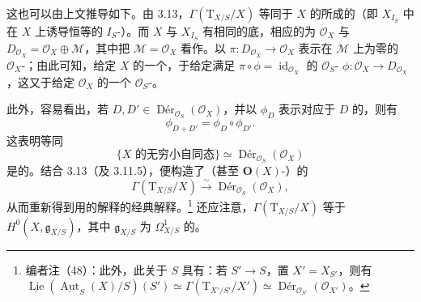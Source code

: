 这也可以由上文推导如下。由 3.13，$\Gamma(\mathrm T_{X/S}/X)$ 等同于 $X$ 的所成的（即 $X_{I_S}$ 中在 $X$ 上诱导恒等的 $I_S$-）。而 $X$ 与 $X_{I_S}$ 有相同的底，相应的为 $\mathcal O_X$ 与 $D_{\mathcal O_X}=\mathcal O_X\oplus\mathcal M$，其中把 $\mathcal M=\mathcal O_X$ 看作。以 $\pi:D_{\mathcal O_X}\to\mathcal O_X$ 表示在 $\mathcal M$ 上为零的 $\mathcal O_X$-；由此可知，给定 $X$ 的一个，于给定满足 $\pi\circ\phi=\operatorname{id}_{\mathcal O_X}$ 的 $\mathcal O_S$- $\phi:\mathcal O_X\to D_{\mathcal O_X}$，这又于给定 $\mathcal O_X$ 的一个 $\mathcal O_S$-。

此外，容易看出，若 $D,D'\in\operatorname{D\text{é}r}_{\mathcal O_S}(\mathcal O_X)$，并以 $\phi_D$ 表示对应于 $D$ 的，则有
\[
\phi_{D+D'}=\phi_D\circ\phi_{D'}.
\]
这表明等同
\[
\{\text{$X$ 的无穷小自同态}\}\simeq\operatorname{D\text{é}r}_{\mathcal O_S}(\mathcal O_X)
\]
是的。结合 3.13（及 3.11.5），便构造了（甚至 $\mathbf O(X)$-）的
\[
\Gamma(\mathrm T_{X/S}/X)\xrightarrow\sim\operatorname{D\text{é}r}_{\mathcal O_S}(\mathcal O_X),
\]
从而重新得到用的解释的经典解释。\footnote{编者注（48）：此外，此关于 $S$ 具有：若 $S'\to S$，置 $X'=X_{S'}$，则有 $\underline{\operatorname{Lie}}(\underline{\operatorname{Aut}}_S(X)/S)(S')\simeq\Gamma(\mathrm T_{X'/S'}/X')\simeq\operatorname{D\text{é}r}_{\mathcal O_{S'}}(\mathcal O_{X'})$。} 还应注意，$\Gamma(\mathrm T_{X/S}/X)$ 等于 $H^0(X,\mathfrak g_{X/S})$，其中 $\mathfrak g_{X/S}$ 为 $\Omega^1_{X/S}$ 的。
